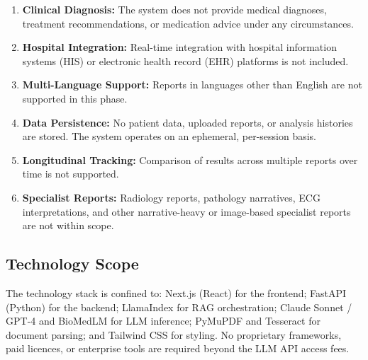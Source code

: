 \begin{enumerate}
    \item \textbf{Clinical Diagnosis:} The system does not provide medical diagnoses, treatment recommendations, or medication advice under any circumstances.
    \item \textbf{Hospital Integration:} Real-time integration with hospital information systems (HIS) or electronic health record (EHR) platforms is not included.
    \item \textbf{Multi-Language Support:} Reports in languages other than English are not supported in this phase.
    \item \textbf{Data Persistence:} No patient data, uploaded reports, or analysis histories are stored. The system operates on an ephemeral, per-session basis.
    \item \textbf{Longitudinal Tracking:} Comparison of results across multiple reports over time is not supported.
    \item \textbf{Specialist Reports:} Radiology reports, pathology narratives, ECG interpretations, and other narrative-heavy or image-based specialist reports are not within scope.
\end{enumerate}

\subsection{Technology Scope}
The technology stack is confined to: Next.js (React) for the frontend; FastAPI (Python) for the backend; LlamaIndex for RAG orchestration; Claude Sonnet / GPT-4 and BioMedLM for LLM inference; PyMuPDF and Tesseract for document parsing; and Tailwind CSS for styling. No proprietary frameworks, paid licences, or enterprise tools are required beyond the LLM API access fees.
